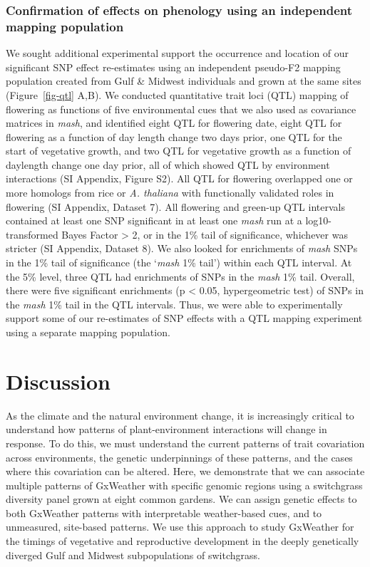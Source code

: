 \documentclass[
  9pt,
  twocolumn,
  twoside]{pnas-new}
\begin{document}
\subsubsection{Confirmation of effects on phenology using an independent
mapping
population}\label{confirmation-of-effects-on-phenology-using-an-independent-mapping-population}

We sought additional experimental support the occurrence and location of
our significant SNP effect re-estimates using an independent pseudo-F2
mapping population created from Gulf \& Midwest individuals and grown at
the same sites (Figure~\ref{fig-qtl} A,B). We conducted quantitative
trait loci (QTL) mapping of flowering as functions of five environmental
cues that we also used as covariance matrices in \emph{mash}, and
identified eight QTL for flowering date, eight QTL for flowering as a
function of day length change two days prior, one QTL for the start of
vegetative growth, and two QTL for vegetative growth as a function of
daylength change one day prior, all of which showed QTL by environment
interactions (SI Appendix, Figure S2). All QTL for flowering overlapped
one or more homologs from rice or \emph{A. thaliana} with functionally
validated roles in flowering (SI Appendix, Dataset 7). All flowering and
green-up QTL intervals contained at least one SNP significant in at
least one \emph{mash} run at a log10-transformed Bayes Factor
\textgreater{} 2, or in the 1\% tail of significance, whichever was
stricter (SI Appendix, Dataset 8). We also looked for enrichments of
\emph{mash} SNPs in the 1\% tail of significance (the `\emph{mash} 1\%
tail') within each QTL interval. At the 5\% level, three QTL had
enrichments of SNPs in the \emph{mash} 1\% tail. Overall, there were
five significant enrichments (p \textless{} 0.05, hypergeometric test)
of SNPs in the \emph{mash} 1\% tail in the QTL intervals. Thus, we were
able to experimentally support some of our re-estimates of SNP effects
with a QTL mapping experiment using a separate mapping population.

\section{Discussion}\label{discussion}

As the climate and the natural environment change, it is increasingly
critical to understand how patterns of plant-environment interactions
will change in response. To do this, we must understand the current
patterns of trait covariation across environments, the genetic
underpinnings of these patterns, and the cases where this covariation
can be altered. Here, we demonstrate that we can associate multiple
patterns of GxWeather with specific genomic regions using a switchgrass
diversity panel grown at eight common gardens. We can assign genetic
effects to both GxWeather patterns with interpretable weather-based
cues, and to unmeasured, site-based patterns. We use this approach to
study GxWeather for the timings of vegetative and reproductive
development in the deeply genetically diverged Gulf and Midwest
subpopulations of switchgrass.
\end{document}

